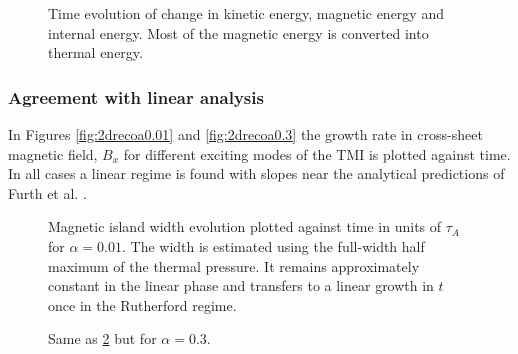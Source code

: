 \documentclass[square]{ws-procs11x85}
\begin{document}
\begin{multicols}{2}
\begin{figure}[H]
\centerline{}
\caption{\label{fig:2denergya0.01}
Time evolution of change in kinetic energy, magnetic energy and internal energy.
Most of the magnetic energy is converted into thermal energy.
 }
\end{figure}






  \subsubsection{Agreement with linear analysis}
  In Figures \ref{fig:2drecoa0.01} and
  \ref{fig:2drecoa0.3} the growth rate in cross-sheet magnetic field, $B_x$ for
  different exciting modes of the TMI is plotted against time. In all cases a
  linear regime is found with slopes near the analytical predictions of Furth et
  al. \cite{Furth}.
 
\begin{figure}[H]
\centerline{}
\caption{\label{fig:2disla0.01}
Magnetic island width evolution plotted against time in units of $\tau_A$ for
$\alpha=0.01$. The width is estimated using
the full-width half maximum of the thermal pressure.
It remains approximately constant in the linear phase and transfers to a linear
growth in $t$ once in the Rutherford regime.
 }
\end{figure}


\begin{figure}[H]
\centerline{}
\caption{\label{fig:2disla0.3}
Same as \ref{fig:2disla0.01} but for $\alpha=0.3$.
 }
\end{figure}


\end{multicols}
\end{document}
